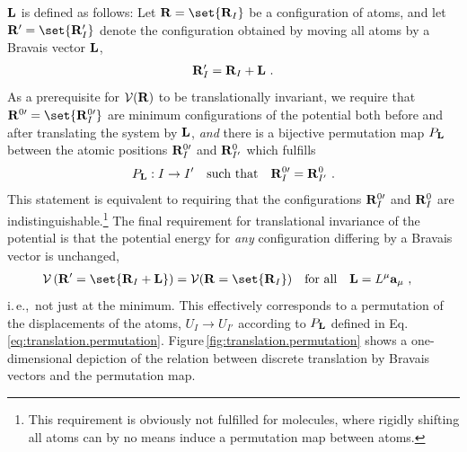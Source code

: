  $\bf L$ is defined as follows:
Let ${\bf R} = \set{{\bf R}_I}$ be a configuration of atoms, %
and let ${\bf R}^{\prime} = \set{{\bf R}^{\prime}_{I}}$ denote the configuration obtained by moving all atoms by a Bravais vector ${\bf L}$,
\begin{align}
	{\bf R}^{\prime}_{I} = {\bf R}_{I} + {\bf L}~.
	\label{eq:RI'}
\end{align}
As a prerequisite for $\mathcal V ({\bf R})$ to be translationally invariant, we require that ${\bf R}^{0 \prime} = \set{{\bf R}^{0 \prime}_{I}}$ are minimum configurations of the potential both before and after translating the system by $\bf L$, \emph{and} there is a bijective permutation map $P_{\bf L}$ between the atomic positions ${\bf R}^{0 \prime}_{I}$ and ${\bf R}^{0}_{I'}$ which fulfills
\begin{align}
	P_{\bf L} : I \to I' \quad\text{such that}\quad
	{\bf R}^{0 \prime}_{I}
		= {\bf R}^{0}_{I'}~.
	\label{eq:translation.permutation}
\end{align}
This statement is equivalent to requiring that the configurations ${\bf R}^{0 \prime}_{I}$ and ${\bf R}^{0}_{I}$ are indistinguishable.\footnote{This requirement is obviously not fulfilled for molecules, where rigidly shifting all atoms can by no means induce a permutation map between atoms.} 
The final requirement for translational invariance of the potential is that the potential energy for \emph{any} configuration differing by a Bravais vector is unchanged,
\begin{align}
	\mathcal{V} \left( {\bf R}' = \set{{\bf R}_{I} + {\bf L}} \right)
	&= \mathcal{V}({\bf R} = \set{{\bf R}_{I}} ) 
	\quad\text{for all}\quad {\bf L} = L^\mu {\bf a}_\mu~,
	\label{eq:inv.V}
\end{align}
i.\,e.,~not just at the minimum. This effectively corresponds to a permutation of the displacements of the atoms, $U_I \to U_{I'}$ according to $P_{\bf L}$ defined in Eq.\,\eqref{eq:translation.permutation}. Figure\,\ref{fig:translation.permutation} shows a one-dimensional depiction of the relation between discrete translation by Bravais vectors and the permutation map.
